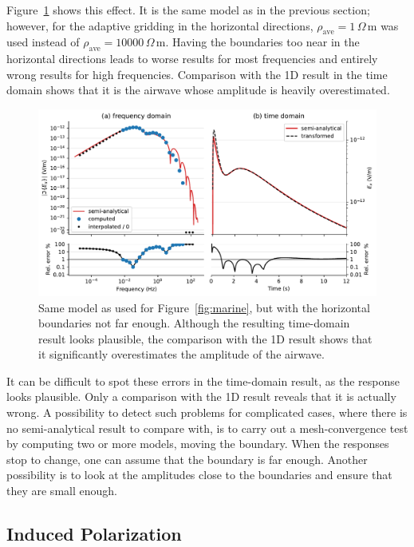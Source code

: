 \documentclass[extra, camera,%
]{gji}
\newlength{\fwidth}
\newcommand{\mr}[1]{\mathrm{#1}}
\newcommand{\ohmm}{\ensuremath{\Omega\,}\text{m}\xspace}
\begin{document}
Figure~\ref{fig:marine-wrong-x-y} shows this effect. It is the same model as in
the previous section; however, for the adaptive gridding in the horizontal
directions, $\rho_\mr{ave}=1\,\ohmm$ was used instead of
$\rho_\mr{ave}=\num{10000}\,\ohmm$. Having the boundaries too near in the
horizontal directions leads to worse results for most frequencies and entirely
wrong results for high frequencies. Comparison with the 1D result in the time
domain shows that it is the airwave whose amplitude is heavily overestimated.
%
\begin{figure}
  \centering
  \includegraphics[width=\fwidth]{08-marine-wrong-x-y}
  \caption{Same model as used for Figure~\ref{fig:marine}, but with the
    horizontal boundaries not far enough. Although the resulting time-domain
    result looks plausible, the comparison with the 1D result shows that it
    significantly overestimates the amplitude of the airwave.}
  \label{fig:marine-wrong-x-y}
\end{figure}
%
It can be difficult to spot these errors in the time-domain result, as the
response looks plausible. Only a comparison with the 1D result reveals that it
is actually wrong. A possibility to detect such problems for complicated cases,
where there is no semi-analytical result to compare with, is to carry out a
mesh-convergence test by computing two or more models, moving the boundary.
When the responses stop to change, one can assume that the boundary is far
enough. Another possibility is to look at the amplitudes close to the
boundaries and ensure that they are small enough.


\subsection{Induced Polarization} %
\end{document}
